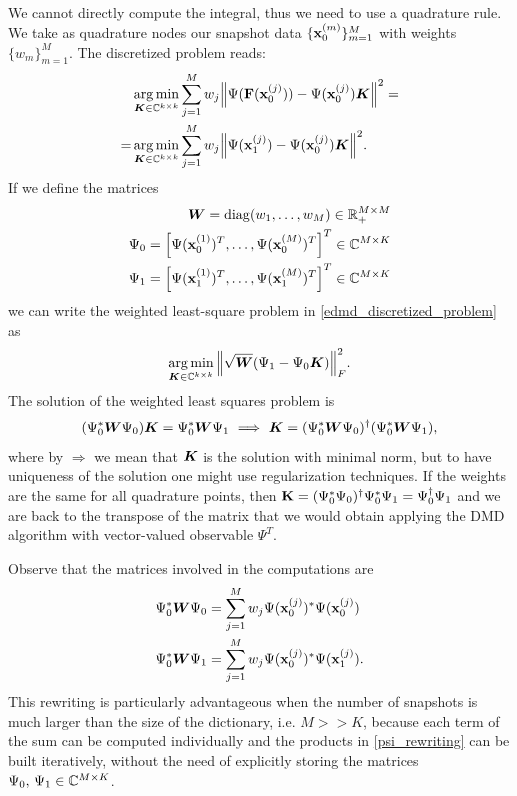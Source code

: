 We cannot directly compute the integral, thus we need to use a quadrature rule. We take as quadrature nodes our snapshot data $\{\vb{x}_0^{(m)}\}_{m = 1}^M$ with weights $\{w_m\}_{m = 1}^M$. The discretized problem reads:
\begin{equation}
\label{edmd_discretized_problem}
\begin{split}
    &\operatorname*{arg\,min}_{\vb*{K}\in\mathbb{C}^{k\times k}} \sum_{j=1}^M w_j \norm{\Psi(\vb{F}(\vb{x}_0^{(j)})) - \Psi(\vb{x}_0^{(j)})\vb*{K}}^2 = \\
    = &\operatorname*{arg\,min}_{\vb*{K}\in\mathbb{C}^{k\times k}} \sum_{j=1}^M w_j \norm{\Psi(\vb{x}_1^{(j)}) - \Psi(\vb{x}_0^{(j)})\vb*{K}}^2.
\end{split}    
\end{equation}
If we define the matrices
\begin{align}
\label{w_def}
\vb*{W} = \mathrm{diag}(w_1,\dots,w_M)\in\mathbb{R}_+^{M\times M} \\
\label{psi0_def}
\Psi_0 = \left[\Psi(\vb{x}_0^{(1)})^T,\dots,\Psi(\vb{x}_0^{(M)})^T\right]^T\in\mathbb{C}^{M\times K} \\
\label{psi1_def}
\Psi_1 = \left[\Psi(\vb{x}_1^{(1)})^T,\dots,\Psi(\vb{x}_1^{(M)})^T\right]^T\in\mathbb{C}^{M\times K}
\end{align}
we can write the weighted least-square problem in \eqref{edmd_discretized_problem} as 
\begin{equation}
    \label{edmd_discretized_problem_matrix}
    \operatorname*{arg\,min}_{\vb*{K}\in\mathbb{C}^{k\times k}}\norm{\sqrt{\vb*{W}}(\Psi_1 - \Psi_0\vb*{K})}_F^2.
\end{equation}
The solution of the weighted least squares problem is
\begin{equation}
    \label{discretized_problem_solution}
    (\Psi_0^*\vb*{W}\Psi_0)\vb*{K} = \Psi_0^*\vb*{W}\Psi_1 \,\,\Longrightarrow\,\, \vb*{K} = (\Psi_0^*\vb*{W}\Psi_0)^{\dagger}(\Psi_0^*\vb*{W}\Psi_1),
\end{equation}
where by $\Longrightarrow$ we mean that $\vb*{K}$ is the solution with minimal norm, but to have uniqueness of the solution one might use regularization techniques. If the weights are the same for all quadrature points, then $\vb{K} = (\Psi_0^*\Psi_0)^{\dagger} \Psi_0^*\Psi_1 = \Psi_0^{\dagger}\Psi_1$ and we are back to the transpose of the matrix that we would obtain applying the DMD algorithm with vector-valued observable $\Psi^T$.

Observe that the matrices involved in the computations are
\begin{equation*}
    \label{psi_rewriting}
    \begin{split}
        \Psi_0^*\vb*{W}\Psi_0 & = \sum_{j=1}^M w_j \Psi(\vb{x}_0^{(j)})^* \Psi(\vb{x}_0^{(j)})\\
        \Psi_0^*\vb*{W}\Psi_1 & = \sum_{j=1}^M w_j \Psi(\vb{x}_0^{(j)})^* \Psi(\vb{x}_1^{(j)}).
    \end{split}
\end{equation*}
This rewriting is particularly advantageous when the number of snapshots is much larger than the size of the dictionary, i.e. $M >> K$, because each term of the sum can be computed individually and the products in \eqref{psi_rewriting} can be built iteratively, without the need of explicitly storing the matrices $\Psi_0,\,\Psi_1\in\mathbb{C}^{M\times K}$.

